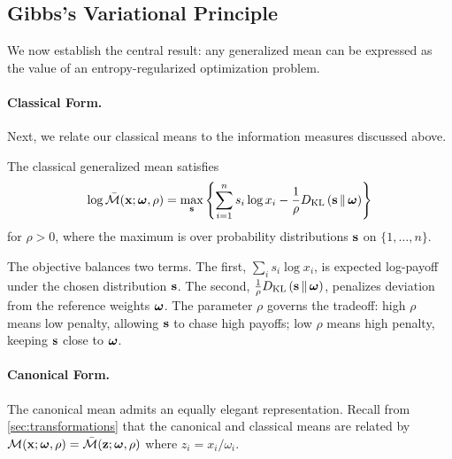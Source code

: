 \subsection{Gibbs's Variational Principle}

We now establish the central result: any generalized mean can be expressed as the value of an entropy-regularized optimization problem.

\paragraph{Classical Form.}
Next, we relate our classical means to the information measures discussed above. 

\begin{proposition}
\label{prop:gibbs-classical}
The classical generalized mean satisfies
\begin{equation}
\label{eq:gibbs-classical}
\log \bar{\mathcal{M}}(\mathbf{x}; \boldsymbol{\omega}, \rho) = \max_{\mathbf{s}} \left\{ \sum_{i=1}^n s_i \log x_i - \frac{1}{\rho} D_{\mathrm{KL}}\left(\mathbf{s} \,\|\, \boldsymbol{\omega}\right) \right\}
\end{equation}
for $\rho > 0$, where the maximum is over probability distributions $\mathbf{s}$ on $\{1, \ldots, n\}$.
\end{proposition}

The objective balances two terms. The first, $\sum_i s_i \log x_i$, is expected log-payoff under the chosen distribution $\mathbf{s}$. The second, $\frac{1}{\rho}D_{\mathrm{KL}}\left(\mathbf{s} \,\|\, \boldsymbol{\omega}\right)$, penalizes deviation from the reference weights $\boldsymbol{\omega}$. The parameter $\rho$ governs the tradeoff: high $\rho$ means low penalty, allowing $\mathbf{s}$ to chase high payoffs; low $\rho$ means high penalty, keeping $\mathbf{s}$ close to $\boldsymbol{\omega}$.

\paragraph{Canonical Form.}

The canonical mean admits an equally elegant representation. Recall from \cref{sec:transformations} that the canonical and classical means are related by $\mathcal{M}(\mathbf{x}; \boldsymbol{\omega}, \rho) = \bar{\mathcal{M}}(\mathbf{z}; \boldsymbol{\omega}, \rho)$ where $z_i = x_i/\omega_i$.

